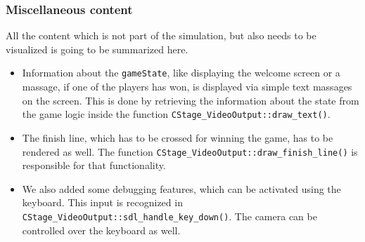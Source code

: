 \subsubsection{Miscellaneous content}
All the content which is not part of the simulation, but also needs to be visualized is going to be summarized here.
\begin{itemize}
\item Information about the \texttt{gameState}, like displaying the welcome screen or a massage, if one of the players has won, is displayed via simple text massages on the screen. This is done by retrieving the information about the state from the game logic inside the function \texttt{CStage_VideoOutput::draw_text()}.
\item The finish line, which has to be crossed for winning the game, has to be rendered as well. The function \texttt{CStage_VideoOutput::draw_finish_line()} is responsible for that functionality. 
\item We also added some debugging features, which can be activated using the keyboard. This input is recognized in \texttt{CStage_VideoOutput::sdl_handle_key_down()}. The camera can be controlled over the keyboard as well.
\end{itemize}
